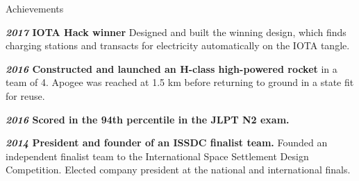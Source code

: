\documentclass[10pt]{resume} %
\begin{document}




\begin{rSection}{Achievements}
    \item \textbf{\textit{2017} IOTA Hack winner} Designed and built the winning design, which finds charging stations and transacts for electricity automatically on the IOTA tangle.
    \item \textbf{\textit{2016} Constructed and launched an H-class high-powered rocket} in a team of 4. Apogee was reached at 1.5 km before returning to ground in a state fit for reuse.
    \item \textbf{\textit{2016} Scored in the 94th percentile in the JLPT N2 exam.}
    \item \textbf{\textit{2014} President and founder of an ISSDC finalist team.} Founded an independent finalist team to the International Space Settlement Design Competition. Elected company president at the national and international finals.
\end{rSection}
\end{document}
